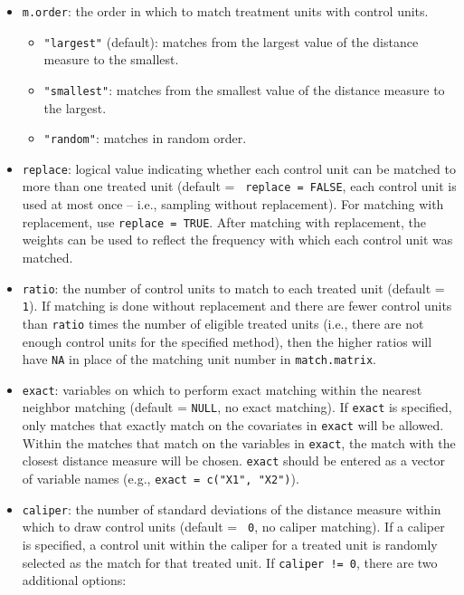 \begin{itemize}
\item \texttt{m.order}: the order in which to match treatment units
  with control units.
  \begin{itemize}
  \item {\tt "largest"} (default): matches from the largest value of
    the distance measure to the smallest.
  \item {\tt "smallest"}: matches from the smallest value of the
    distance measure to the largest.
  \item {\tt "random"}: matches in random order.
  \end{itemize}
\item \texttt{replace}: logical value indicating whether each control
  unit can be matched to more than one treated unit (default = {\tt
    replace = FALSE}, each control unit is used at most once -- i.e.,
  sampling without replacement). For matching with replacement, use
  \texttt{replace = TRUE}.  After matching with replacement, the weights
  can be used to reflect the frequency with which each control unit was matched.
\item \texttt{ratio}: the number of control units to match to each
  treated unit (default = {\tt 1}).  If matching is done without
  replacement and there are fewer control units than {\tt ratio} times
  the number of eligible treated units (i.e., there are not enough
  control units for the specified method), then the higher ratios will
  have \texttt{NA} in place of the matching unit number in
  \texttt{match.matrix}.
\item \texttt{exact}: variables on which to perform exact matching
  within the nearest neighbor matching (default = {\tt NULL}, no exact
  matching).  If \texttt{exact} is specified, only matches that
  exactly match on the covariates in \texttt{exact} will be allowed.
  Within the matches that match on the variables in \texttt{exact},
  the match with the closest distance measure will be chosen.
  \texttt{exact} should be entered as a vector of variable names
  (e.g., \texttt{exact = c("X1", "X2")}).
\item \texttt{caliper}: the number of standard deviations of the
  distance measure within which to draw control units (default = {\tt
    0}, no caliper matching).  If a caliper is specified, a control
  unit within the caliper for a treated unit is randomly selected as
  the match for that treated unit.  If \texttt{caliper != 0}, there
  are two additional options:
  \begin{itemize} 

\end{itemize}
\end{itemize}

